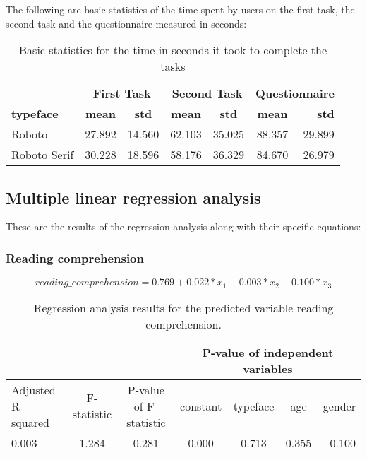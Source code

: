 \documentclass{article}
\begin{document}
The following are basic statistics of the time spent by users on the first task, the second task and the questionnaire measured in seconds:

\begin{table}[H]
\centering
\begin{tabular}{ l|c|c|c|c|c|r } 
\multicolumn{1}{c}{}  &
\multicolumn{2}{c}{\textbf{First Task}}  &
\multicolumn{2}{c}{\textbf{Second Task}}  & \multicolumn{2}{c}{\textbf{Questionnaire}} \\
     \textbf{typeface} & \textbf{mean} & \textbf{std}& \textbf{mean} & \textbf{std}& \textbf{mean} & \textbf{std}\\
    \hline
     Roboto & 27.892 & 14.560 & 62.103 & 35.025  & 88.357 & 29.899 \\
     Roboto Serif & 30.228 & 18.596 & 58.176 & 36.329  & 84.670 & 26.979\\
\end{tabular}
\caption{\label{tab:statisticssecondtask}Basic statistics for the time in seconds it took to complete the tasks}
\end{table}


\subsection*{Multiple linear regression analysis}
These are the results of the regression analysis along with their specific equations:

\subsubsection*{Reading comprehension}
\begin{equation}
reading\_comprehension = 0.769 + 0.022 * x_1 - 0.003 * x_2 - 0.100 * x_3
\label{eq:comprehensionregression}
\end{equation}
\begin{table}[H]
\centering
\begin{tabular}{ l|c|c|c|c|c|r } 
     \multicolumn{3}{c}{} & \multicolumn{4}{c}{\textbf{P-value of independent variables}} \\
    \hline
     Adjusted R-squared & F-statistic & P-value of F-statistic & constant & typeface & age & gender \\
     0.003 & 1.284 & 0.281 & 0.000 & 0.713 & 0.355 & 0.100 \\
\end{tabular}
\caption{\label{tab:comprehensionreg}Regression analysis results for the predicted variable reading comprehension.}
\end{table}
\end{document}
